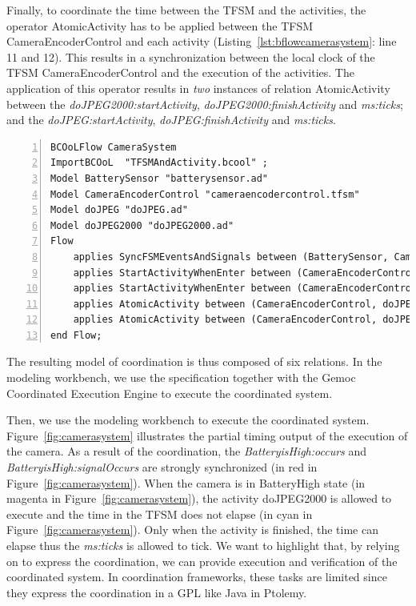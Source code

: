 Finally, to coordinate the time between the TFSM and the activities, the operator AtomicActivity has to be applied between the TFSM CameraEncoderControl and each activity (Listing~\ref{lst:bflowcamerasystem}: line 11 and 12). This results in a synchronization between the local clock of the TFSM CameraEncoderControl and the execution of the activities. The application of this operator results in \emph{two} instances of \moccml relation AtomicActivity between the \mse \emph{doJPEG2000:startActivity}, \emph{doJPEG2000:finishActivity} and \emph{ms:ticks}; and the \mse \emph{doJPEG:startActivity}, \emph{doJPEG:finishActivity} and \emph{ms:ticks}.


\begin{lstlisting}[language=bflow,
caption={\bflow specification for the Surveillance Camera System},
label={lst:bflowcamerasystem}, 
basicstyle=\scriptsize\ttfamily, backgroundcolor=\color{LGrey}, numbers=left, xleftmargin=2pt]
BCOoLFlow CameraSystem
ImportBCOoL  "TFSMAndActivity.bcool" ;
Model BatterySensor "batterysensor.ad"
Model CameraEncoderControl "cameraencodercontrol.tfsm"
Model doJPEG "doJPEG.ad"
Model doJPEG2000 "doJPEG2000.ad"
Flow 
	applies SyncFSMEventsAndSignals between (BatterySensor, CameraEncoderControl);
	applies StartActivityWhenEnter between (CameraEncoderControl, doJPEG);
	applies StartActivityWhenEnter between (CameraEncoderControl, doJPEG2000);
	applies AtomicActivity between (CameraEncoderControl, doJPEG);		
	applies AtomicActivity between (CameraEncoderControl, doJPEG2000);		
end Flow;
\end{lstlisting}

The resulting model of coordination is thus composed of six relations. In the modeling workbench, we use the \bflow specification together with the Gemoc Coordinated Execution Engine to execute the coordinated system. 





Then, we use the modeling workbench to execute the coordinated system. Figure~\ref{fig:camerasystem} illustrates the partial timing output of the execution of the camera. As a result of the coordination, the \mse \emph{BatteryisHigh:occurs} and \emph{BatteryisHigh:signalOccurs} are strongly synchronized (in red in Figure~\ref{fig:camerasystem}). When the camera is in BatteryHigh state (in magenta in Figure~\ref{fig:camerasystem}), the activity doJPEG2000 is allowed to execute and the time in the TFSM does not elapse (in cyan in Figure~\ref{fig:camerasystem}). Only when the activity is finished, the time can elapse thus the \mse \emph{ms:ticks} is allowed to tick. We want to highlight that, by relying on \ccsl to express the coordination, we can provide execution and verification of the coordinated system. In coordination frameworks, these tasks are limited since they express the coordination in a GPL like Java in Ptolemy.
	
